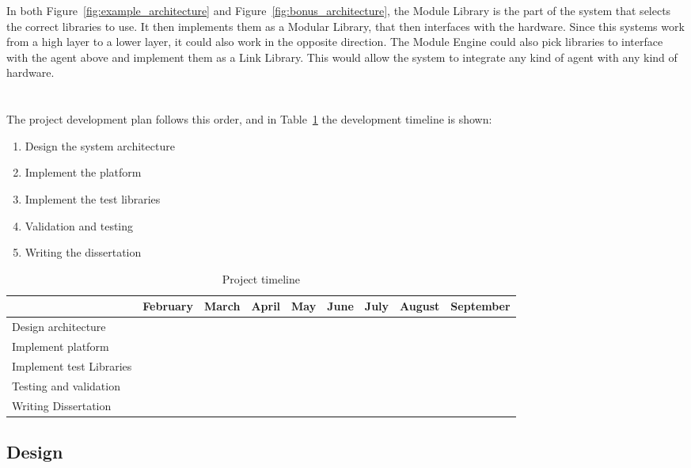 In both Figure~\ref{fig:example_architecture} and Figure~\ref{fig:bonus_architecture}, the Module Library is the part of the system that selects the correct libraries to use. It then implements them as a Modular Library, that then interfaces with the hardware. Since this systems work from a high layer to a lower layer, it could also work in the opposite direction. The Module Engine could also pick libraries to interface with the agent above and implement them as a Link Library. This would allow the system to integrate any kind of agent with any kind of hardware.\\\\\\

The project development plan follows this order, and in Table~\ref{tbl:timeline} the development timeline is shown:
\begin{enumerate}
	\item Design the system architecture
	\item Implement the platform
	\item Implement the test libraries
	\item Validation and testing
	\item Writing the dissertation
\end{enumerate}

\begin{table}[h!]
	\centering
	\caption{Project timeline}
	\begin{tabular}{||l||c|c|c|c|c|c|c|c||}
		\hline
		\ & February & March & April & May & June & July & August & September\\
		\hline
		Design architecture & \cellcolor{green} & \cellcolor{green} & & & & & & \\
		\hline
		Implement platform & & \cellcolor{green} & \cellcolor{green} & \cellcolor{green} & & & & \\
		\hline
		Implement test Libraries & & & & \cellcolor{green} & \cellcolor{green} & & & \\
		\hline
		Testing and validation & & & & & \cellcolor{green} & \cellcolor{green} & &  \\
		\hline
		Writing Dissertation & & & & & & \cellcolor{green} & \cellcolor{green} & \cellcolor{green} \\
		\hline
	\end{tabular}
	\label{tbl:timeline}
\end{table}

\subsection{Design}

